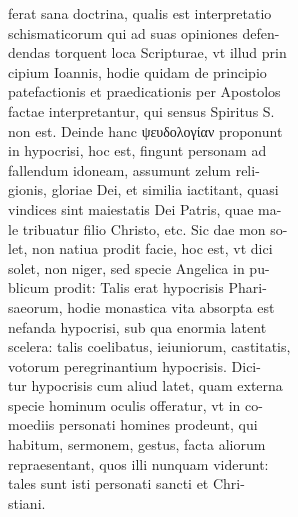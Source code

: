 \documentclass{article}
\begin{document}
\begin{pages}
                ferat sana doctrina, qualis est interpretatio \\
                schismaticorum qui ad suas opiniones defen- \\
                dendas torquent loca Scripturae, vt illud prin \\
                cipium Ioannis, hodie quidam de principio \\
                patefactionis et praedicationis per Apostolos \\
                factae interpretantur, qui sensus Spiritus S. \\
                non est. Deinde hanc ψευδολογίαν proponunt \\
                in hypocrisi, hoc est, fingunt personam ad \\
                fallendum idoneam, assumunt zelum reli- \\
                gionis, gloriae Dei, et similia iactitant, quasi \\
                vindices sint maiestatis Dei Patris, quae ma- \\
                le tribuatur filio Christo, etc. Sic dae mon so- \\
                let, non natiua prodit facie, hoc est, vt dici \\
                solet, non niger, sed specie Angelica in pu- \\
                blicum prodit: Talis erat hypocrisis Phari- \\
                saeorum, hodie monastica vita absorpta est \\
                nefanda hypocrisi, sub qua enormia latent \\
                scelera: talis coelibatus, ieiuniorum, castitatis, \\
                votorum peregrinantium hypocrisis. Dici- \\
                tur hypocrisis cum aliud latet, quam externa \\
                specie hominum oculis offeratur, vt in co- \\
                moediis personati homines prodeunt, qui \\
                habitum, sermonem, gestus, facta aliorum \\
                repraesentant, quos illi nunquam viderunt: \\
                tales sunt isti personati sancti et Chri- \\
                stiani. \\

\end{pages}
\end{document}
